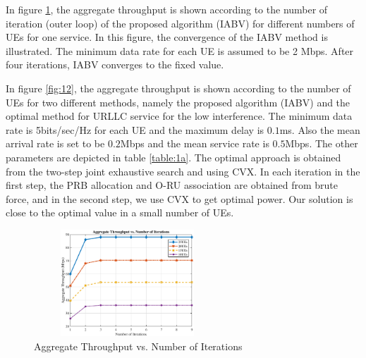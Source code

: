 \documentclass[lettersize,journal]{IEEEtran}
\begin{document}
In figure \ref{fig:11}, the aggregate throughput is shown according to the number of iteration (outer loop) of the
proposed algorithm (IABV) for different numbers of UEs for one service. In this figure, the convergence of the IABV method is illustrated. The minimum data rate for each UE is assumed to be 2 Mbps.
After four iterations, IABV converges to the fixed value.


In figure \ref{fig:12}, the aggregate throughput is shown according to the number of UEs for two different methods, namely the
proposed algorithm (IABV) and the optimal method for URLLC service for the low interference.
The minimum data rate is 5bits/sec/Hz for each UE and the maximum delay is $0.1$ms.
Also the mean arrival rate is set to be $0.2$Mbps and the mean service rate is $0.5$Mbps.
The other parameters are depicted in table \ref{table:1a}.
The optimal approach is obtained from the two-step joint exhaustive search and using CVX.
In each iteration in the first step, the PRB allocation and O-RU association are obtained from brute force, and in the second step, we use CVX to get optimal power.
Our solution is close to the optimal value in a small number of UEs.
\begin{figure}%
  \centering
  \captionsetup{justification=centering}
     \includegraphics[width=7cm,height=4cm]{iter.eps}
  \caption{Aggregate Throughput vs. Number of Iterations}
  \label{fig:11}
\end{figure}
\end{document}

